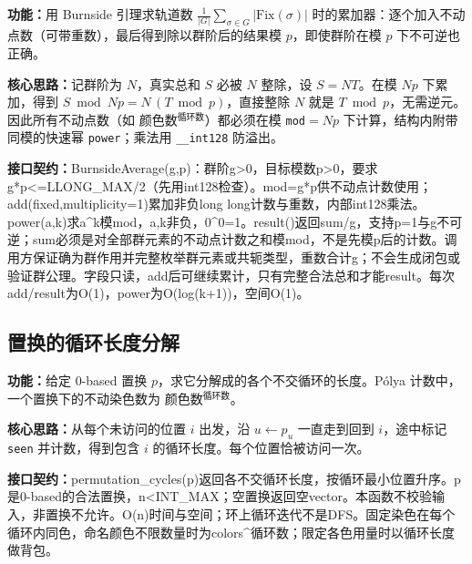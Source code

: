 \noindent\textbf{功能：}\allowbreak 用 Burnside 引理求轨道数 $\frac{1}{|G|}\sum_{\sigma\in G}|\mathrm{Fix}(\sigma)|$ 时的累加器：逐个加入不动点数（可带重数），最后得到除以群阶后的结果模 $p$，即使群阶在模 $p$ 下不可逆也正确。

\textbf{核心思路：}\allowbreak 记群阶为 $N$，真实总和 $S$ 必被 $N$ 整除，设 $S=NT$。在模 $Np$ 下累加，得到 $S\bmod Np=N\,(T\bmod p)$，直接整除 $N$ 就是 $T\bmod p$，无需逆元。因此所有不动点数（如 颜色数$^{\text{循环数}}$）都必须在模 \texttt{mod}$=Np$ 下计算，结构内附带同模的快速幂 \texttt{power}；乘法用 \texttt{\_\_int128} 防溢出。



{\sloppy{}\noindent\textbf{接口契约：}BurnsideAverage(g,p)：群阶g>0，目标模数p>0，要求g*p<=LLONG\_MAX/2（先用int128检查）。mod=g*p供不动点计数使用；add(fixed,multiplicity=1)累加非负long long计数与重数，内部int128乘法。power(a,k)求a\textasciicircum{}k模mod，a,k非负，0\textasciicircum{}0=1。result()返回sum/g，支持p=1与g不可逆；sum必须是对全部群元素的不动点计数之和模mod，不是先模p后的计数。调用方保证确为群作用并完整枚举群元素或共轭类型，重数合计g；不会生成闭包或验证群公理。字段只读，add后可继续累计，只有完整合法总和才能result。每次add/result为O(1)，power为O(log(k+1))，空间O(1)。\par}



\Needspace{348pt}

\subsection{置换的循环长度分解}\label{compact-permutation_cycles}

\noindent\textbf{功能：}\allowbreak 给定 0-based 置换 $p$，求它分解成的各个不交循环的长度。Pólya 计数中，一个置换下的不动染色数为 颜色数$^{\text{循环数}}$。

\textbf{核心思路：}\allowbreak 从每个未访问的位置 $i$ 出发，沿 $u\leftarrow p_u$ 一直走到回到 $i$，途中标记 \texttt{seen} 并计数，得到包含 $i$ 的循环长度。每个位置恰被访问一次。



{\sloppy{}\noindent\textbf{接口契约：}permutation\_cycles(p)返回各不交循环长度，按循环最小位置升序。p是0-based的合法置换，n<INT\_MAX；空置换返回空vector。本函数不校验输入，非置换不允许。O(n)时间与空间；环上循环迭代不是DFS。固定染色在每个循环内同色，命名颜色不限数量时为colors\textasciicircum{}循环数；限定各色用量时以循环长度做背包。\par}

